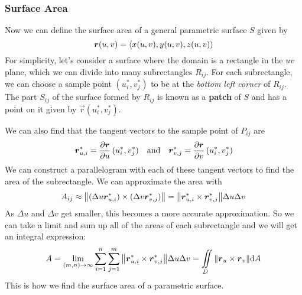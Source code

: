 \subsubsection{Surface Area}
Now we can define the surface area of a general parametric surface $S$ given by 
\[ \boldsymbol{r}(u,v) =  \left\langle x(u,v), y(u,v), z(u,v)\right\rangle \]
For simplicity, let's consider a surface where the domain is a rectangle in the $uv$ plane, which we can divide into many subrectangles $R_{ij}$. For each subrectangle, we can choose a sample point $(u_{i}^*, v_{j}^*)$ to be at the \textit{bottom left corner} of $R_{ij}$. The part $S_{ij}$ of the surface formed by $R_{ij}$ is known as a \textbf{patch} of $S$ and has a point on it given by $\vec r(u_{i}^*, v_{j}^*)$. \par
We can also find that the tangent vectors to the sample point of $P_{ij}$ are
\[ \boldsymbol{r}_{u,i}^* = \pdv{\boldsymbol{r}}{u}\,(u_{i}^*, v_{j}^*) \quad \text{and} \quad \boldsymbol{r}_{v,j}^* = \pdv{\boldsymbol{r}}{v}\,(u_{i}^*, v_{j}^*)\]
We can construct a parallelogram with each of these tangent vectors to find the area of the subrectangle. We can approximate the area with
\[ A_{ij} \approx \norm{(\Delta u \boldsymbol{r}_{u,i}^*)\times(\Delta v\boldsymbol{r}_{v,j}^*)} = \norm{\boldsymbol{r}_{u,i}^* \times\boldsymbol{r}_{v,j}^*}\Delta u\Delta v\]
As $\Delta u$ and $\Delta v$ get smaller, this becomes a more accurate approximation. So we can take a limit and sum up all of the areas of each subrectangle and we will get an integral expression:
\[ A = \lim_{(m,n)\to\infty}\sum_{i=1}^n\sum_{j=1}^m \norm{\boldsymbol{r}_{u,i}^*\times\boldsymbol{r}_{v,j}^*}\Delta u\Delta v = \iint\limits_D \norm{\boldsymbol{r}_u \times \boldsymbol{r}_v}\dd A\]
This is how we find the surface area of a parametric surface. 
